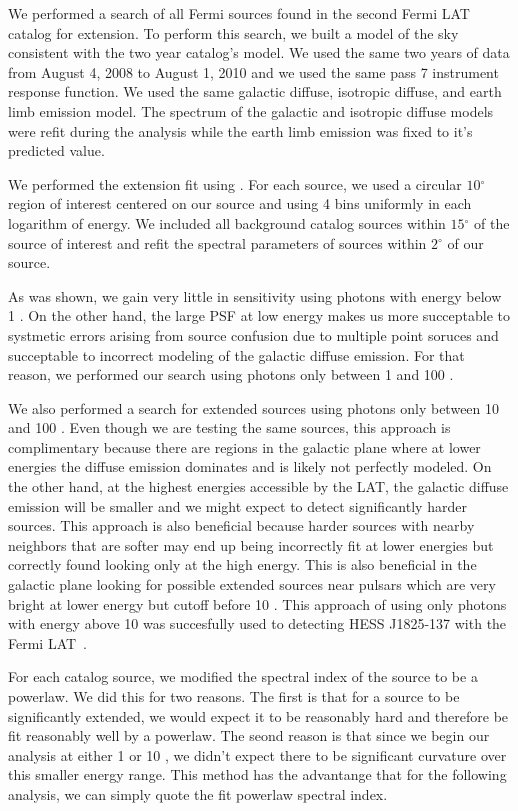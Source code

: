 \documentclass[12pt,preprint]{aastex}
\newcommand{\gev}{\text{GeV}\xspace}
\renewcommand{\deg}{\ensuremath{^\circ}\xspace}
\newcommand{\pointlike}{\text{\em pointlike}\xspace}
\begin{document}
We performed a search of all Fermi sources found in the second Fermi LAT
catalog for extension.  To perform this search, we built a model of the
sky consistent with the two year catalog's model.   We used the same two
years of data from August 4, 2008 to August 1, 2010 and we used the same
pass 7 instrument response function.  We used the same galactic diffuse,
isotropic diffuse, and earth limb emission model. The spectrum of the
galactic and isotropic diffuse models were refit during the analysis
while the earth limb emission was fixed to it's predicted value.

We performed the extension fit using \pointlike.  For each source, we
used a circular $10\deg$ region of interest centered on our source and
using 4 bins uniformly in each logarithm of energy.  We included all
background catalog sources within $15\deg$ of the source of interest
and refit the spectral parameters of sources within $2\deg$ of our source.

As was shown, we gain very little in sensitivity using photons with energy
below 1 \gev. On the other hand, the large PSF at low energy makes us
more succeptable to systmetic errors arising from source confusion due
to multiple point soruces and succeptable to incorrect modeling of the
galactic diffuse emission.  For that reason, we performed our search
using photons only between 1 \gev and 100 \gev.

We also performed a search for extended sources using photons only between
10 \gev and 100 \gev. Even though we are testing the same sources, this
approach is complimentary because there are regions in the galactic
plane where at lower energies the diffuse emission dominates and is
likely not perfectly modeled. On the other hand, at the highest energies
accessible by the LAT, the galactic diffuse emission will be smaller and
we might expect to detect significantly harder sources. This approach is
also beneficial because harder sources with nearby neighbors that are
softer may end up being incorrectly fit at lower energies but correctly
found looking only at the high energy.  This is also beneficial in the
galactic plane looking for possible extended sources near pulsars which
are very bright at lower energy but cutoff before 10 \gev.  This approach
of using only photons with energy above 10 \gev was succesfully used to detecting
HESS J1825-137 with the Fermi LAT~\cite{fermi_hess_j1825}.

For each catalog source, we modified the spectral index of the source
to be a powerlaw. We did this for two reasons. The first is that for a
source to be significantly extended, we would expect it to be reasonably
hard and therefore be fit reasonably well by a powerlaw.  The seond reason
is that since we begin our analysis at either 1 \gev or 10 \gev, we didn't
expect there to be significant curvature over this smaller energy range.
This method has the advantange that for the following analysis, we can
simply quote the fit powerlaw spectral index.
\end{document}
